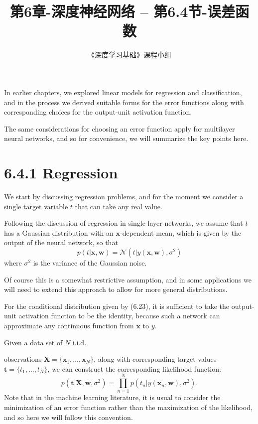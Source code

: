 \documentclass{article}
\title{第6章-深度神经网络 -- 第6.4节-误差函数}
\author{《深度学习基础》课程小组}
\begin{document}
\maketitle
\tableofcontents



In earlier chapters, we explored linear models for regression and classification, and in the process we derived suitable forms for the error functions along with corresponding choices for the output-unit activation function. 

The same considerations for choosing an error function apply for multilayer neural networks, and so for convenience, we will summarize the key points here.

\section{6.4.1 Regression}

We start by discussing regression problems, and for the moment we consider a single target variable $t$ that can take any real value. 

Following the discussion of regression in single-layer networks, we assume that $t$ has a Gaussian distribution with an $\mathbf{x}$-dependent mean, which is given by the output of the neural network, so that
\begin{equation}
p(t|\mathbf{x}, \mathbf{w}) = \mathcal{N}\left(t|y(\mathbf{x}, \mathbf{w}), \sigma^2\right)
\tag{6.23}
\end{equation}
where $\sigma^2$ is the variance of the Gaussian noise. 

Of course this is a somewhat restrictive assumption, and in some applications we will need to extend this approach to allow for more general distributions. 

For the conditional distribution given by (6.23), it is sufficient to take the output-unit activation function to be the identity, because such a network can approximate any continuous function from $\mathbf{x}$ to $y$. 

Given a data set of $N$ i.i.d. 

observations $\mathbf{X} = \{\mathbf{x}_1,\ldots,\mathbf{x}_N\}$, along with corresponding target values $\mathbf{t} = \{t_1,\ldots,t_N\}$, we can construct the corresponding likelihood function:
\begin{equation}
p(\mathbf{t}|\mathbf{X}, \mathbf{w}, \sigma^2) = \prod_{n=1}^N p(t_n|y(\mathbf{x}_n, \mathbf{w}), \sigma^2).
\tag{6.24}
\end{equation}
Note that in the machine learning literature, it is usual to consider the minimization of an error function rather than the maximization of the likelihood, and so here we will follow this convention. 
\end{document}
